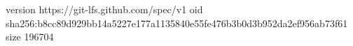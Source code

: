 version https://git-lfs.github.com/spec/v1
oid sha256:b8cc89d929bb14a5227e177a1135840e55fe476b3b0d3b952da2ef956ab73f61
size 196704
